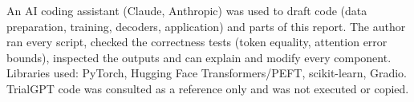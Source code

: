 \documentclass[conference]{IEEEtran}
\begin{document}
An AI coding assistant (Claude, Anthropic) was used to draft code (data preparation, training,
decoders, application) and parts of this report. The author ran every script, checked the
correctness tests (token equality, attention error bounds), inspected the outputs and can explain
and modify every component. Libraries used: PyTorch, Hugging Face Transformers/PEFT, scikit-learn,
Gradio. TrialGPT code was consulted as a reference only and was not executed or copied.
\end{document}
